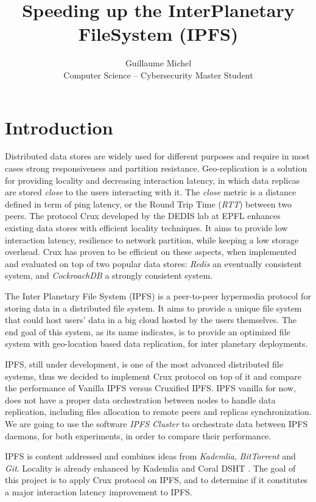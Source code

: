 \documentclass[a4paper,11pt,oneside]{report}
\title{Speeding up the InterPlanetary FileSystem (IPFS)}
\author{Guillaume Michel\\Computer Science -- Cybersecurity Master Student}
\begin{document}
\maketitle

\maketoc

\chapter{Introduction}

Distributed data stores are widely used for different purposes and require in most cases strong responsiveness and partition resistance. Geo-replication is a solution for providing locality and decreasing interaction latency, in which data replicas are stored \textit{close} to the users interacting with it. The \textit{close} metric is a distance defined in term of ping latency, or the Round Trip Time (\textit{RTT}) between two peers.
The protocol Crux \cite{crux} developed by the DEDIS lab at EPFL enhances existing data stores with efficient locality techniques. It aims to provide low interaction latency, resilience to network partition, while keeping a low storage overhead. Crux has proven to be efficient on these aspects, when implemented and evaluated on top of two popular data stores: \textit{Redis} \cite{redis} an eventually consistent system, and \textit{CockroachDB} \cite{cockroachdb} a strongly consistent system.

The Inter Planetary File System (IPFS) is a peer-to-peer hypermedia protocol for storing data in a distributed file system. It aims to provide a unique file system that could host users' data in a big cloud hosted by the users themselves. The end goal of this system, as its name indicates, is to provide an optimized file system with geo-location based data replication, for inter planetary deployments.

IPFS, still under development, is one of the most advanced distributed file systems, thus we decided to implement Crux protocol on top of it and compare the performance of Vanilla IPFS versus Cruxified IPFS. IPFS vanilla for now, does not have a proper data orchestration between nodes to handle data replication, including files allocation to remote peers and replicas synchronization. We are going to use the software \textit{IPFS Cluster} to orchestrate data between IPFS daemons, for both experiments, in order to compare their performance.

IPFS is content addressed and combines ideas from \textit{Kademlia}, \textit{BitTorrent} and \textit{Git}. Locality is already enhanced by Kademlia \cite{kademlia} and Coral DSHT \cite{coral}. The goal of this project is to apply Crux protocol on IPFS, and to determine if it constitutes a major interaction latency improvement to IPFS.
\end{document}
